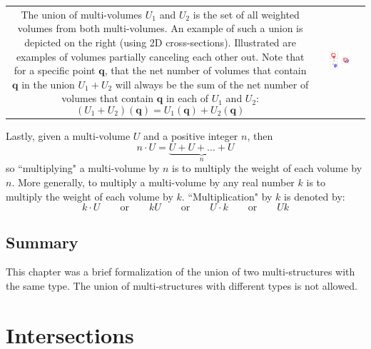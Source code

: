 \documentclass{book}
\begin{document}
\begin{tabular}{cc}
\parbox{0.5\textwidth}{
The union of multi-volumes \(U_1\) and \(U_2\) is the set of all weighted volumes from both multi-volumes. An example of such a union is depicted on the right (using 2D cross-sections). Illustrated are examples of volumes partially canceling each other out. Note that for a specific point \(\mathbf{q}\), that the net number of volumes that contain \(\mathbf{q}\) in the union \(U_1 + U_2\) will always be the sum of the net number of volumes that contain \(\mathbf{q}\) in each of \(U_1\) and \(U_2\): 
\[(U_1 + U_2)(\mathbf{q}) = U_1(\mathbf{q}) + U_2(\mathbf{q})\]
} & \parbox{0.5\textwidth}{
\includegraphics[width = 0.5\textwidth]{Unions/multivolume_unions}
}
\end{tabular}

Lastly, given a multi-volume \(U\) and a positive integer \(n\), then
\[n \cdot U = \underbrace{U + U + ... + U}_n\]
so ``multiplying" a multi-volume by \(n\) is to multiply the weight of each volume by \(n\). More generally, to multiply a multi-volume by any real number \(k\) is to multiply the weight of each volume by \(k\). ``Multiplication" by \(k\) is denoted by:
\[k \cdot U \quad\quad\text{or}\quad\quad k U \quad\quad\text{or}\quad\quad U \cdot k \quad\quad\text{or}\quad\quad U k\]




\section{Summary}

This chapter was a brief formalization of the union of two multi-structures with the same type. The union of multi-structures with different types is not allowed.





\chapter{Intersections}
\end{document}
